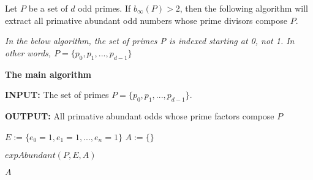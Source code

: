 \documentclass[../paper.tex]{subfiles}
\begin{document}
\begin{theorem} 
Let $P$ be a set of $d$ odd primes. If $b_{\infty}(P) > 2$, then the 
following algorithm will extract all primative
abundant odd numbers whose prime divisors compose $P$.
\end{theorem}
%
%
%
%
%


\textit{In the below algorithm, the set of primes P is indexed 
starting at 0, not 1. In other words, $P = \{p_0, p_1, ..., p_{d-1}\}$}



{\setlength{\parindent}{0cm}

\textbf{The main algorithm}

\textbf{INPUT:} The set of primes 
$P = \{p_0, p_1, ..., p_{d-1}\}$.

\textbf{OUTPUT:} All primative abundant odds whose prime factors
compose $P$

}


\begin{algorithmic}

\STATE $E := \{e_0 = 1,e_1 = 1,...,e_n = 1\}$
\STATE $A := \{ \}$ %

\STATE $expAbundant(P, E, A)$

\RETURN $A$

\end{algorithmic}
\end{document}
